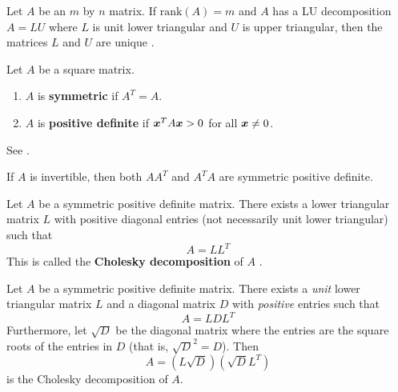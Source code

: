 \begin{theorem}
Let $A$ be an $m$ by $n$ matrix. If $\mathrm{rank}(A) = m$ and $A$ has a LU decomposition $A = LU$ where $L$ is unit lower triangular and $U$ is upper triangular, then the matrices $L$ and $U$ are unique \cite[p.124]{KN}.
\end{theorem}

\begin{definition}
Let $A$ be a square matrix.
\begin{enumerate}
\item $A$ is {\bf symmetric} if $A^T = A$.
\item $A$ is {\bf positive definite} if $\boldsymbol{x}^T A \boldsymbol{x} > 0$ for all $\boldsymbol{x} \not= 0$.
\end{enumerate}
See \cite[p.84]{MH}.
\end{definition}

\begin{example}
If $A$ is invertible, then both $AA^T$ and $A^TA$ are symmetric positive definite.
\end{example}

\begin{theorem}
Let $A$ be a symmetric positive definite matrix. There exists a lower triangular matrix $L$ with positive diagonal entries (not necessarily unit lower triangular) such that
$$
A = L L^T
$$
This is called the {\bf Cholesky decomposition} of $A$ \cite[p.84]{MH}.
\end{theorem}

\begin{proposition}
Let $A$ be a symmetric positive definite matrix. There exists a {\it unit} lower triangular matrix $L$ and a diagonal matrix $D$ with {\it positive} entries such that
$$
A = LDL^T
$$
Furthermore, let $\sqrt{D}$ be the diagonal matrix where the entries are the square roots of the entries in $D$ (that is, $\sqrt{D}^2 = D$). Then
$$
A = (L\sqrt{D})(\sqrt{D}L^T)
$$
is the Cholesky decomposition of $A$.
\end{proposition}

